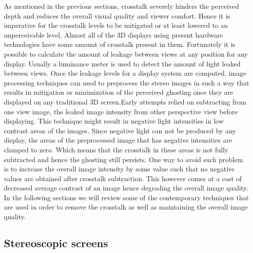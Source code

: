 As mentioned in the previous sections, crosstalk severely hinders the perceived depth and reduces the overall visual quality and viewer comfort. Hence it is imperative for the crosstalk levels to be mitigated or at least lowered to an unperceivable level. Almost all of the 3D displays using present hardware technologies have some amount of crosstalk present in them. Fortunately it is possible to calculate the amount of leakage between views at any position for any display. Usually a luminance meter is used to detect the amount of light leaked between views. Once the leakage levels for a display system are computed, image processing techniques can used to preprocess the stereo images in such a way that results in mitigation or minimization of the perceived ghosting once they are displayed on any traditional 3D screen.Early attempts relied on subtracting from one view image, the leaked image intensity from other perspective view before displaying. This technique might result in  negative light intensities in low contrast areas of the images. Since negative light can not be produced by any display, the areas of the preprocessed image that has negative intensities are clamped to zero. Which means that the crosstalk in these areas is not fully subtracted and hence the ghosting still persists. One way to avoid such problem is to increase the overall image intensity by some value such that no negative values are obtained after crosstalk subtraction. This however comes at a cost of decreased average contrast of an image hence degrading the overall image quality. In the following sections we will review some of the contemporary techniques that are used in order to remove the crosstalk as well as maintaining the overall image quality.

\subsection{Stereoscopic screens}

